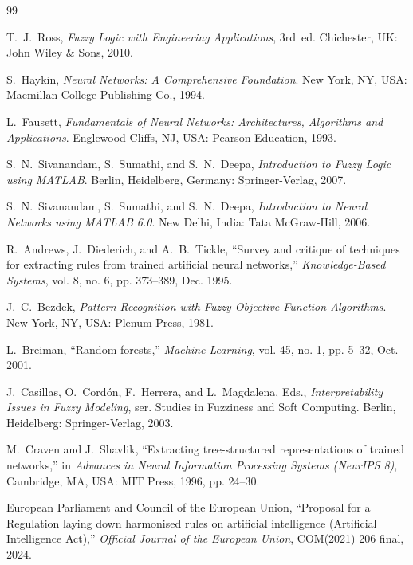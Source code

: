 \documentclass{report}
\begin{document}
\begin{thebibliography}{99}

T.~J.~Ross, \emph{Fuzzy Logic with Engineering Applications}, 3rd~ed. Chichester, UK: John Wiley \& Sons, 2010.

S.~Haykin, \emph{Neural Networks: A Comprehensive Foundation}. New York, NY, USA: Macmillan College Publishing Co., 1994.

L.~Fausett, \emph{Fundamentals of Neural Networks: Architectures, Algorithms and Applications}. Englewood Cliffs, NJ, USA: Pearson Education, 1993.

S.~N.~Sivanandam, S.~Sumathi, and S.~N.~Deepa, \emph{Introduction to Fuzzy Logic using MATLAB}. Berlin, Heidelberg, Germany: Springer-Verlag, 2007.

S.~N.~Sivanandam, S.~Sumathi, and S.~N.~Deepa, \emph{Introduction to Neural Networks using MATLAB 6.0}. New Delhi, India: Tata McGraw-Hill, 2006.

R.~Andrews, J.~Diederich, and A.~B.~Tickle, ``Survey and critique of techniques for extracting rules from trained artificial neural networks,'' \emph{Knowledge-Based Systems}, vol. 8, no. 6, pp. 373--389, Dec. 1995.

J.~C.~Bezdek, \emph{Pattern Recognition with Fuzzy Objective Function Algorithms}. New York, NY, USA: Plenum Press, 1981.

L.~Breiman, ``Random forests,'' \emph{Machine Learning}, vol. 45, no. 1, pp. 5--32, Oct. 2001.

J.~Casillas, O.~Cord{\'o}n, F.~Herrera, and L.~Magdalena, Eds., \emph{Interpretability Issues in Fuzzy Modeling}, ser. Studies in Fuzziness and Soft Computing. Berlin, Heidelberg: Springer-Verlag, 2003.

M.~Craven and J.~Shavlik, ``Extracting tree-structured representations of trained networks,'' in \emph{Advances in Neural Information Processing Systems (NeurIPS 8)}, Cambridge, MA, USA: MIT Press, 1996, pp. 24--30.

European Parliament and Council of the European Union, ``Proposal for a Regulation laying down harmonised rules on artificial intelligence (Artificial Intelligence Act),'' \emph{Official Journal of the European Union}, COM(2021) 206 final, 2024.


\end{thebibliography}
\end{document}
